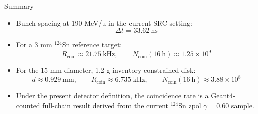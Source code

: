 \documentclass[aspectratio=169]{beamer}
\begin{document}
\begin{frame}{Summary}
\small
\begin{itemize}
  \item Bunch spacing at 190 MeV/u in the current SRC setting:
  \[
  \Delta t = 33.62~\mathrm{ns}
  \]
  \item For a 3 mm $^{124}$Sn reference target:
  \[
  R_{\mathrm{coin}} \approx 21.75~\mathrm{kHz},\qquad
  N_{\mathrm{coin}}(16~\mathrm{h}) \approx 1.25\times 10^9
  \]
  \item For the 15 mm diameter, 1.2 g inventory-constrained disk:
  \[
  d \approx 0.929~\mathrm{mm},\qquad
  R_{\mathrm{coin}} \approx 6.735~\mathrm{kHz},\qquad
  N_{\mathrm{coin}}(16~\mathrm{h}) \approx 3.88\times 10^8
  \]
  \item Under the present detector definition, the coincidence rate is a Geant4-counted full-chain result derived from the current $^{124}$Sn zpol $\gamma=0.60$ sample.
\end{itemize}
\end{frame}
\end{document}
